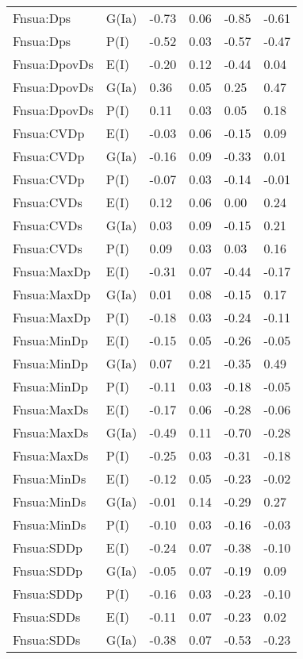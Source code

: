 \begin{center}
\begin{longtable}{|p{1.1in}|p{0.7in}|p{0.7in}|p{0.6in}|p{0.6in}|p{0.6in}|}
  Fnsua:Dps & G(Ia) & -0.73 & 0.06 & -0.85 & -0.61 \\ 
  Fnsua:Dps & P(I) & -0.52 & 0.03 & -0.57 & -0.47 \\ 
  Fnsua:DpovDs & E(I) & -0.20 & 0.12 & -0.44 & 0.04 \\ 
  Fnsua:DpovDs & G(Ia) & 0.36 & 0.05 & 0.25 & 0.47 \\ 
  Fnsua:DpovDs & P(I) & 0.11 & 0.03 & 0.05 & 0.18 \\ 
  Fnsua:CVDp & E(I) & -0.03 & 0.06 & -0.15 & 0.09 \\ 
  Fnsua:CVDp & G(Ia) & -0.16 & 0.09 & -0.33 & 0.01 \\ 
  Fnsua:CVDp & P(I) & -0.07 & 0.03 & -0.14 & -0.01 \\ 
  Fnsua:CVDs & E(I) & 0.12 & 0.06 & 0.00 & 0.24 \\ 
  Fnsua:CVDs & G(Ia) & 0.03 & 0.09 & -0.15 & 0.21 \\ 
  Fnsua:CVDs & P(I) & 0.09 & 0.03 & 0.03 & 0.16 \\ 
  Fnsua:MaxDp & E(I) & -0.31 & 0.07 & -0.44 & -0.17 \\ 
  Fnsua:MaxDp & G(Ia) & 0.01 & 0.08 & -0.15 & 0.17 \\ 
  Fnsua:MaxDp & P(I) & -0.18 & 0.03 & -0.24 & -0.11 \\ 
  Fnsua:MinDp & E(I) & -0.15 & 0.05 & -0.26 & -0.05 \\ 
  Fnsua:MinDp & G(Ia) & 0.07 & 0.21 & -0.35 & 0.49 \\ 
  Fnsua:MinDp & P(I) & -0.11 & 0.03 & -0.18 & -0.05 \\ 
  Fnsua:MaxDs & E(I) & -0.17 & 0.06 & -0.28 & -0.06 \\ 
  Fnsua:MaxDs & G(Ia) & -0.49 & 0.11 & -0.70 & -0.28 \\ 
  Fnsua:MaxDs & P(I) & -0.25 & 0.03 & -0.31 & -0.18 \\ 
  Fnsua:MinDs & E(I) & -0.12 & 0.05 & -0.23 & -0.02 \\ 
  Fnsua:MinDs & G(Ia) & -0.01 & 0.14 & -0.29 & 0.27 \\ 
  Fnsua:MinDs & P(I) & -0.10 & 0.03 & -0.16 & -0.03 \\ 
  Fnsua:SDDp & E(I) & -0.24 & 0.07 & -0.38 & -0.10 \\ 
  Fnsua:SDDp & G(Ia) & -0.05 & 0.07 & -0.19 & 0.09 \\ 
  Fnsua:SDDp & P(I) & -0.16 & 0.03 & -0.23 & -0.10 \\ 
  Fnsua:SDDs & E(I) & -0.11 & 0.07 & -0.23 & 0.02 \\ 
  Fnsua:SDDs & G(Ia) & -0.38 & 0.07 & -0.53 & -0.23 \\ 

\end{longtable}
\end{center}
